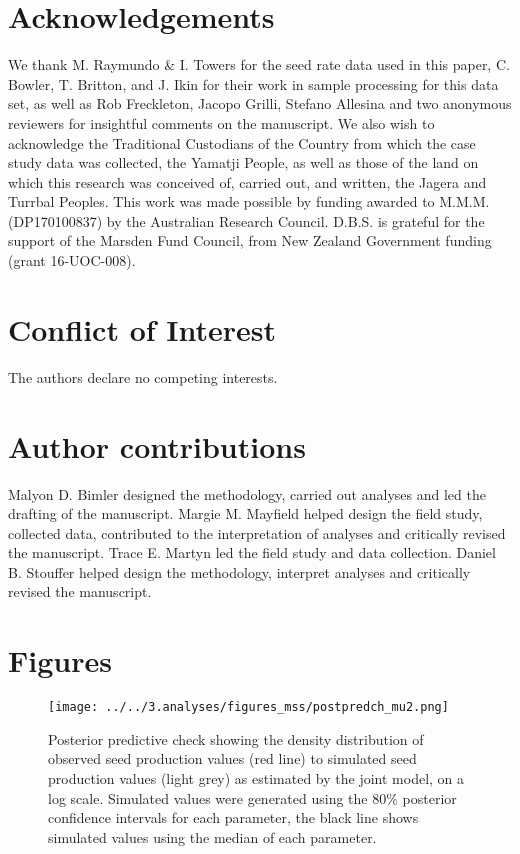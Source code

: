 \documentclass[a4,12pt]{article}
\begin{document}
\begin{refsection}
\section*{Acknowledgements}

We thank M. Raymundo \& I. Towers for the seed rate data used in this paper, C. Bowler, T. Britton, and J. Ikin for their work in sample processing for this data set, as well as Rob Freckleton, Jacopo Grilli, Stefano Allesina and two anonymous reviewers for insightful comments on the manuscript. We also wish to acknowledge the Traditional Custodians of the Country from which the case study data was collected, the Yamatji People, as well as those of the land on which this research was conceived of, carried out, and written, the Jagera and Turrbal Peoples. This work was made possible by funding awarded to M.M.M. (DP170100837) by the Australian Research Council. D.B.S. is grateful for the support of the Marsden Fund Council, from New Zealand Government funding (grant 16-UOC-008).


\section*{Conflict of Interest}

The authors declare no competing interests. 

\section*{Author contributions}

Malyon D. Bimler designed the methodology, carried out analyses and led the drafting of the manuscript. Margie M. Mayfield helped design the field study, collected data, contributed to the interpretation of analyses and critically revised the manuscript. Trace E. Martyn led the field study and data collection. Daniel B. Stouffer helped design the methodology, interpret analyses and critically revised the manuscript. 

\newpage

\printbibliography   

\end{refsection}

\newpage 

\section{Figures}


    \begin{figure}[H]
        \texttt{[image: ../../3.analyses/figures\_mss/postpredch\_mu2.png]}
        \caption{Posterior predictive check showing the density distribution of observed seed production values (red line) to simulated seed production values (light grey) as estimated by the joint model, on a log scale. Simulated values were generated using the 80\% posterior confidence intervals for each parameter, the black line shows simulated values using the median of each parameter. }
        \label{fig:ppcheckmu2}
    \end{figure}
\end{document}
